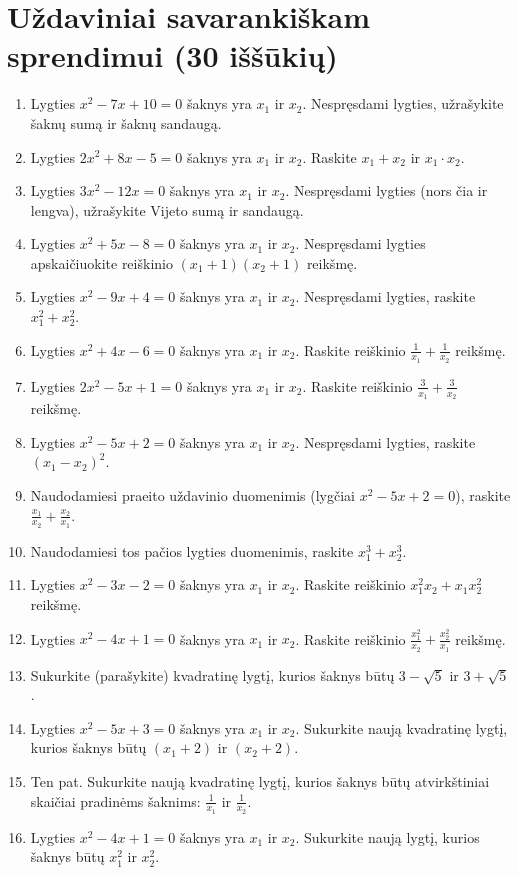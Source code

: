 \documentclass[11pt,a4paper]{scrartcl}
\begin{document}
\vspace{0.5cm}

\newpage
\section{Uždaviniai savarankiškam sprendimui (30 iššūkių)}

\begin{enumerate}
    \renewcommand{\labelenumi}{\textbf{\theenumi.}}
    
    \item Lygties $x^2 - 7x + 10 = 0$ šaknys yra $x_1$ ir $x_2$. Nespręsdami lygties, užrašykite šaknų sumą ir šaknų sandaugą.
    \item Lygties $2x^2 + 8x - 5 = 0$ šaknys yra $x_1$ ir $x_2$. Raskite $x_1 + x_2$ ir $x_1 \cdot x_2$.
    \item Lygties $3x^2 - 12x = 0$ šaknys yra $x_1$ ir $x_2$. Nespręsdami lygties (nors čia ir lengva), užrašykite Vijeto sumą ir sandaugą.
    \item Lygties $x^2 + 5x - 8 = 0$ šaknys yra $x_1$ ir $x_2$. Nespręsdami lygties apskaičiuokite reiškinio $(x_1 + 1)(x_2 + 1)$ reikšmę.
    \item Lygties $x^2 - 9x + 4 = 0$ šaknys yra $x_1$ ir $x_2$. Nespręsdami lygties, raskite $x_1^2 + x_2^2$.
    \item Lygties $x^2 + 4x - 6 = 0$ šaknys yra $x_1$ ir $x_2$. Raskite reiškinio $\frac{1}{x_1} + \frac{1}{x_2}$ reikšmę.
    \item Lygties $2x^2 - 5x + 1 = 0$ šaknys yra $x_1$ ir $x_2$. Raskite reiškinio $\frac{3}{x_1} + \frac{3}{x_2}$ reikšmę.
    
    \item Lygties $x^2 - 5x + 2 = 0$ šaknys yra $x_1$ ir $x_2$. Nespręsdami lygties, raskite $(x_1 - x_2)^2$.
    \item Naudodamiesi praeito uždavinio duomenimis (lygčiai $x^2 - 5x + 2 = 0$), raskite $\frac{x_1}{x_2} + \frac{x_2}{x_1}$.
    \item Naudodamiesi tos pačios lygties duomenimis, raskite $x_1^3 + x_2^3$.
    \item Lygties $x^2 - 3x - 2 = 0$ šaknys yra $x_1$ ir $x_2$. Raskite reiškinio $x_1^2 x_2 + x_1 x_2^2$ reikšmę.
    \item Lygties $x^2 - 4x + 1 = 0$ šaknys yra $x_1$ ir $x_2$. Raskite reiškinio $\frac{x_1^2}{x_2} + \frac{x_2^2}{x_1}$ reikšmę.
    \item Sukurkite (parašykite) kvadratinę lygtį, kurios šaknys būtų $3 - \sqrt{5}$ ir $3 + \sqrt{5}$.
    \item Lygties $x^2 - 5x + 3 = 0$ šaknys yra $x_1$ ir $x_2$. Sukurkite naują kvadratinę lygtį, kurios šaknys būtų $(x_1 + 2)$ ir $(x_2 + 2)$.
    \item Ten pat. Sukurkite naują kvadratinę lygtį, kurios šaknys būtų atvirkštiniai skaičiai pradinėms šaknims: $\frac{1}{x_1}$ ir $\frac{1}{x_2}$.
    \item Lygties $x^2 - 4x + 1 = 0$ šaknys yra $x_1$ ir $x_2$. Sukurkite naują lygtį, kurios šaknys būtų $x_1^2$ ir $x_2^2$.
    

\end{enumerate}
\end{document}
